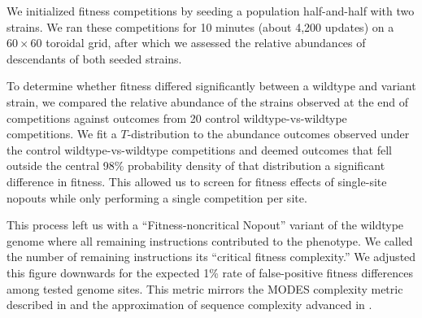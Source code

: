 We initialized fitness competitions by seeding a population half-and-half with two strains.
We ran these competitions for 10 minutes (about 4,200 updates) on a $60\times60$ toroidal grid, after which we assessed the relative abundances of descendants of both seeded strains.

To determine whether fitness differed significantly between a wildtype and variant strain, we compared the relative abundance of the strains observed at the end of competitions against outcomes from 20 control wildtype-vs-wildtype competitions.
We fit a $T$-distribution to the abundance outcomes observed under the control wildtype-vs-wildtype competitions and deemed outcomes that fell outside the central 98\% probability density of that distribution a significant difference in fitness.
This allowed us to screen for fitness effects of single-site nopouts while only performing a single competition per site.

This process left us with a ``Fitness-noncritical Nopout'' variant of the wildtype genome where all remaining instructions contributed to the phenotype.
We called the number of remaining instructions its ``critical fitness complexity.''
We adjusted this figure downwards for the expected 1\% rate of false-positive fitness differences among tested genome sites.
This metric mirrors the MODES complexity metric described in \citep{dolson2019modes} and the approximation of sequence complexity advanced in \citep{adami2000evolution}.




